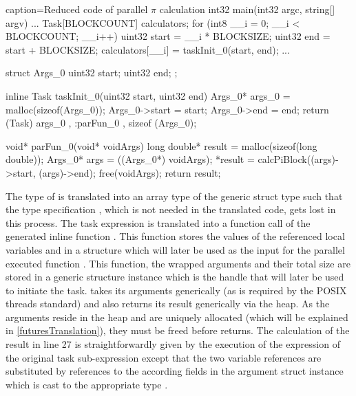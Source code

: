 \begin{ccode}{caption=Reduced code of parallel $\pi$ calculation}
int32 main(int32 argc, string[] argv) {
...
  Task[BLOCKCOUNT] calculators;
  for (int8 __i = 0; __i < BLOCKCOUNT; __i++) { 
    uint32 start = __i * BLOCKSIZE; 
    uint32 end = start + BLOCKSIZE; 
    calculators[__i] = taskInit_0(start, end); 
  }
...
}

struct Args_0 { 
  uint32 start; 
  uint32 end; 
};

inline Task taskInit_0(uint32 start, uint32 end) { 
  Args_0* args_0 = malloc(sizeof(Args_0)); 
  Args_0->start = start; 
  Args_0->end = end; 
  return (Task){ args_0 , :parFun_0 , sizeof (Args_0)}; 
}

void* parFun_0(void* voidArgs) { 
  long double* result = malloc(sizeof(long double)); 
  Args_0* args = ((Args_0*) voidArgs); 
  *result = calcPiBlock((args)->start, (args)->end); 
  free(voidArgs); 
  return result; 
}
\end{ccode}
The type of  is translated into an array type of the generic  struct type such that the type specification , which is not needed in the translated code, gets lost in this process. The task expression  is translated into a function call of the generated inline function . This function stores the values of the referenced local variables  and  in a structure which will later be used as the input for the parallel executed function . This function, the wrapped arguments and their total size are stored in a generic  structure instance which is the handle that will later be used to initiate the task.  takes its arguments generically (as is required by the POSIX threads standard) and also returns its result generically via the heap. As the arguments reside in the heap and are uniquely allocated (which will be explained in \ref{futuresTranslation}), they must be freed before  returns. The calculation of the result in line 27 is straightforwardly given by the execution of the expression of the original task sub-expression  except that the two variable references are substituted by references to the according fields in the argument struct instance  which is cast to the appropriate type .
